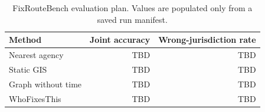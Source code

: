 \begin{table}[t]
\centering
\caption{FixRouteBench evaluation plan. Values are populated only from a saved run manifest.}
\begin{tabular}{lrr}
\toprule
Method & Joint accuracy & Wrong-jurisdiction rate \\
\midrule
Nearest agency & TBD & TBD \\
Static GIS & TBD & TBD \\
Graph without time & TBD & TBD \\
WhoFixesThis & TBD & TBD \\
\bottomrule
\end{tabular}
\end{table}
